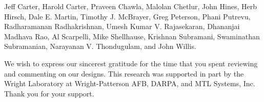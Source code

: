 \documentclass[12pt]{report}
\begin{document}
Jeff Carter, Harold Carter, Praveen Chawla, Malolan Chetlur, John Hines,
Herb Hirsch, Dale E. Martin, Timothy J. McBrayer, Greg Peterson, Phani
Putrevu, Radharamanan Radhakrishnan, Umesh Kumar V. Rajasekaran, Dhananjai
Madhava Rao, Al Scarpelli, Mike Shellhause, Krishnan Subramani,
Swaminathan Subramanian, Narayanan V. Thondugulam, and John Willis.

We wish to express our sincerest gratitude for the time that you spent
reviewing and commenting on our designs.  This research was supported in
part by the Wright Laboratory at Wright-Patterson AFB, DARPA, and MTL
Systems, Inc.  Thank you for your support.
\end{document}
